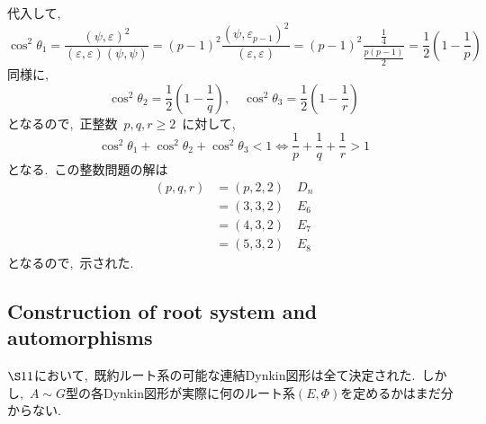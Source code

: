 \documentclass[uplatex,dvipdfmx]{jsarticle}
\begin{document}
\begin{myproof}
代入して,
\begin{equation*}
    \cos^2 \theta_1 = \frac{(\psi, \varepsilon)^2}{(\varepsilon, \varepsilon)(\psi, \psi)} = (p-1)^2 \frac{(\psi, \varepsilon_{p-1})^2}{(\varepsilon, \varepsilon)} = (p-1)^2 \frac{\frac{1}{4}}{\frac{p(p-1)}{2}} = \frac{1}{2} \left(1 - \frac{1}{p}\right)
\end{equation*}
同様に,~
\begin{equation*}
    \cos^2 \theta_2 = \frac{1}{2} \left(1 - \frac{1}{q}\right), \quad \cos^2 \theta_3 = \frac{1}{2} \left(1 - \frac{1}{r}\right)
\end{equation*}
となるので,~正整数~$p,q,r \geq 2$~に対して,
\begin{equation*}
    \cos^2 \theta_1 + \cos^2 \theta_2 + \cos^2 \theta_3 < 1 \iff \frac{1}{p} + \frac{1}{q} + \frac{1}{r} > 1
\end{equation*}
となる.~この整数問題の解は
\begin{align*}
(p, q, r) &= (p, 2, 2) \quad D_n \\
          &= (3, 3, 2) \quad E_6 \\
          &= (4, 3, 2) \quad E_7 \\
          &= (5, 3, 2) \quad E_8
\end{align*}
となるので,~示された.
\end{myproof}
\newpage

\subsection{Construction of root system and automorphisms}
$\S 11$において,~既約ルート系の可能な連結Dynkin図形は全て決定された.~しかし,~$A\sim G$型の各Dynkin図形が実際に何のルート系$(E, \Phi)$を定めるかはまだ分からない.
\end{document}
